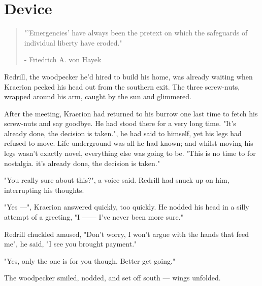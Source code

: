 \chapter{Device}

\vspace{-1.3cm}
\begin{localsize}{10}
	\begin{quote}
		"'Emergencies' have always been the pretext on which the safeguards of individual liberty have eroded."
		\begin{flushright}- Friedrich A. von Hayek\end{flushright}
	\end{quote} 
\end{localsize}
\vspace{1cm}

Redrill, the woodpecker he'd hired to build his home, was already waiting when Kraerion peeked his head out from the southern exit. The three screw-nuts, wrapped around his arm, caught by the sun and glimmered.

After the meeting, Kraerion had returned to his burrow one last time to fetch his screw-nuts and say goodbye. He had stood there for a very long time. 
"It's already done, the decision is taken.", he had said to himself, yet his legs had refused to move. Life underground was all he had known; and whilst moving his legs wasn't exactly novel, everything else was going to be. "This is no time to for nostalgia. it's already done, the decision is taken."

"You really sure about this?", a voice said. Redrill had snuck up on him, interrupting his thoughts.

"Yes —", Kraerion answered quickly, too quickly. He nodded his head in a silly attempt of a greeting, "I —— I've never been more sure."

Redrill chuckled amused, "Don't worry, I won't argue with the hands that feed me", he said, "I see you brought payment."

"Yes, only the one is for you though. Better get going."

The woodpecker smiled, nodded, and set off south — wings unfolded.

